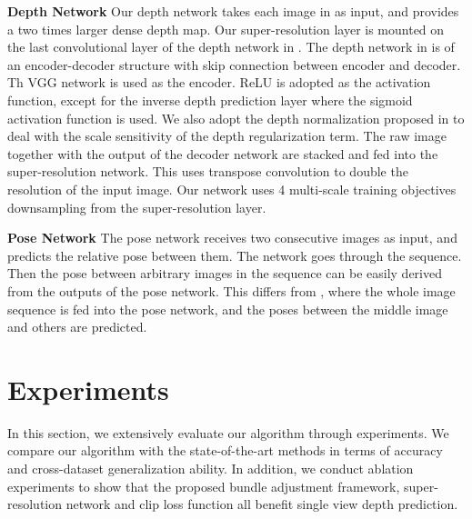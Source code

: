 \documentclass[10pt,twocolumn,letterpaper]{article}
\begin{document}
\textbf{Depth Network} \quad Our depth network takes each image in   as input, and provides a two times larger dense depth map. Our super-resolution layer is mounted on the last convolutional layer of the depth network in \cite{zhou2017unsupervised}. The depth network in \cite{zhou2017unsupervised} is of an encoder-decoder structure with skip connection between encoder and decoder. Th VGG network \cite{simonyan2014very} is used as the encoder. ReLU is adopted as the activation function, except for the inverse depth prediction layer where the sigmoid activation function is used. We also adopt the depth normalization proposed in \cite{wang2018learning} to deal with the scale sensitivity of the depth regularization term. The raw image together with the output of the decoder network are stacked and fed into the super-resolution network. This uses transpose convolution to double the resolution of the input image. Our network uses 4 multi-scale training objectives downsampling from the super-resolution layer. 

\textbf{Pose Network} \quad The pose network receives two consecutive images  as input, and predicts the relative pose between them. The network goes through the sequence. Then the pose between arbitrary images in the sequence   can be easily derived from the outputs of the pose network. This differs from \cite{zhou2017unsupervised,wang2018learning}, where the whole image sequence is fed into the pose network, and the poses between the middle image and others are predicted.


\section{Experiments}
In this section, we extensively evaluate our algorithm through experiments. We compare our algorithm with the state-of-the-art methods in terms of accuracy and cross-dataset generalization ability. In addition, we conduct ablation experiments to show that the proposed bundle adjustment framework, super-resolution network and clip loss function all benefit single view depth prediction. %
\end{document}
